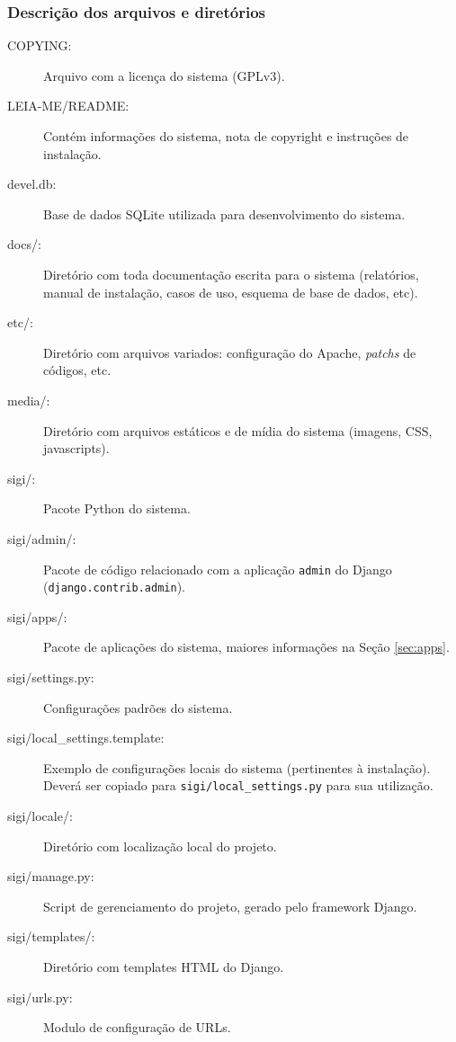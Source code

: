 \subsubsection{Descrição dos arquivos e diretórios}
\begin{description}
\item[COPYING:] Arquivo com a licença do sistema (GPLv3).

\item[LEIA-ME/README:] Contém informações do sistema, nota de
  copyright e instruções de instalação.

\item[devel.db:] Base de dados SQLite utilizada para desenvolvimento
  do sistema.

\item[docs/:] Diretório com toda documentação escrita para o sistema
  (relatórios, manual de instalação, casos de uso, esquema de base de
  dados, etc).

\item[etc/:] Diretório com arquivos variados: configuração do Apache,
  \textit{patchs} de códigos, etc.

\item[media/:] Diretório com arquivos estáticos e de mídia do sistema
  (imagens, CSS, javascripts).

\item[sigi/:] Pacote Python do sistema.

\item[sigi/admin/:] Pacote de código relacionado com a aplicação
  \verb|admin| do Django (\verb|django.contrib.admin|).

\item[sigi/apps/:] Pacote de aplicações do sistema, maiores
  informações na Seção \ref{sec:apps}.

\item[sigi/settings.py:] Configurações padrões do sistema.

\item[sigi/local\_settings.template:] Exemplo de configurações locais
  do sistema (pertinentes à instalação). Deverá ser copiado para
  \verb|sigi/local_settings.py| para sua utilização.

\item[sigi/locale/:] Diretório com localização local do projeto.

\item[sigi/manage.py:] Script de gerenciamento do projeto, gerado pelo
  framework Django.

\item[sigi/templates/:] Diretório com templates HTML do Django.

\item[sigi/urls.py:] Modulo de configuração de URLs.
\end{description}

